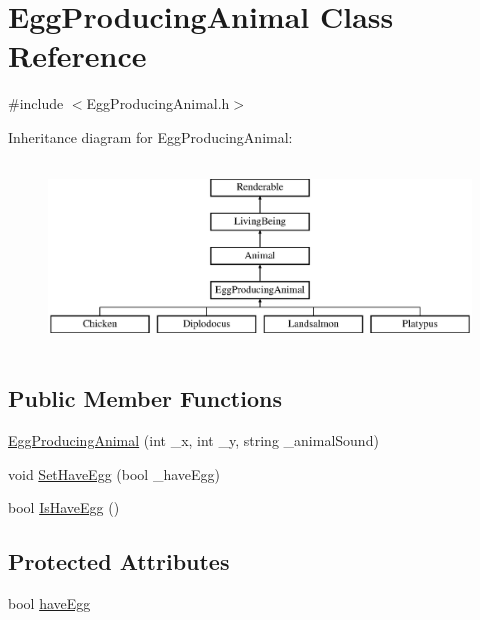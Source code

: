 \hypertarget{classEggProducingAnimal}{}\section{Egg\+Producing\+Animal Class Reference}
\label{classEggProducingAnimal}


{\ttfamily \#include $<$Egg\+Producing\+Animal.\+h$>$}

Inheritance diagram for Egg\+Producing\+Animal\+:\begin{figure}[H]
\begin{center}
\leavevmode
\includegraphics[height=5.000000cm]{classEggProducingAnimal}
\end{center}
\end{figure}
\subsection*{Public Member Functions}
\begin{DoxyCompactItemize}
\item 
\mbox{\hyperlink{classEggProducingAnimal_ae56591f20dbf37986ec8de71985727ad}{Egg\+Producing\+Animal}} (int \+\_\+x, int \+\_\+y, string \+\_\+animal\+Sound)
\item 
void \mbox{\hyperlink{classEggProducingAnimal_ac699d03b81f89eb711757003acc3c2e3}{Set\+Have\+Egg}} (bool \+\_\+have\+Egg)
\item 
bool \mbox{\hyperlink{classEggProducingAnimal_acb9c9562617faea641c7247010b1de28}{Is\+Have\+Egg}} ()
\end{DoxyCompactItemize}
\subsection*{Protected Attributes}
\begin{DoxyCompactItemize}
\item 
bool \mbox{\hyperlink{classEggProducingAnimal_adba93a141ce347708ae9341c6a2f5a7e}{have\+Egg}}
\end{DoxyCompactItemize}
